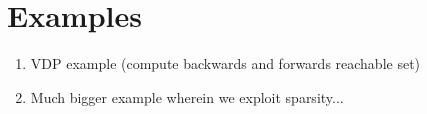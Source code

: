 \section{Examples}\label{sec:Examples}

\begin{enumerate}
	\item VDP example (compute backwards and forwards reachable set)
	\item Much bigger example wherein we exploit sparsity...
\end{enumerate}